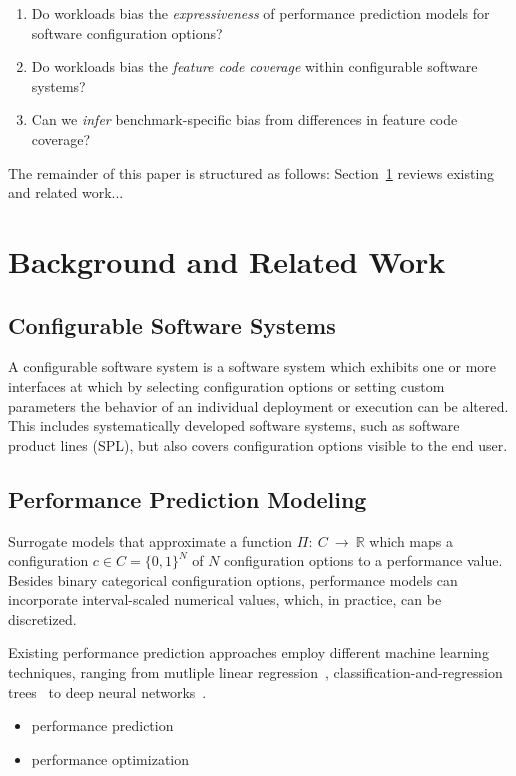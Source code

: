 \documentclass[conference]{IEEEtran}
\begin{document}
\begin{enumerate}
	\item Do workloads bias the \emph{expressiveness} of performance prediction models for software configuration options?
	\item Do workloads bias the \emph{feature code coverage} within configurable software systems?
	\item Can we \emph{infer} benchmark-specific bias from differences in feature code coverage?
\end{enumerate}

The remainder of this paper is structured as follows: Section~\ref{sec:related_work} reviews existing and related work...

\section{Background and Related Work}\label{sec:related_work}
\subsection{Configurable Software Systems}
A configurable software system is a software system which exhibits one or more interfaces at which by selecting configuration options or setting custom parameters the behavior of an individual deployment or execution can be altered. This includes systematically developed software systems, such as software product lines (SPL), but also covers configuration options visible to the end user.  
\subsection{Performance Prediction Modeling}
Surrogate models that approximate a function $\Pi:~C~\rightarrow~\mathbb{R}$ which maps a configuration $c \in C =\lbrace 0,1 \rbrace^N$ of $N$ configuration options to a performance value. Besides binary categorical configuration options, performance models can incorporate interval-scaled numerical values, which, in practice, can be discretized.

Existing performance prediction approaches employ different machine learning techniques, ranging from mutliple linear regression~\cite{siegmund_performance-influence_2015}, classification-and-regression trees~\cite{guoVariabilityawarePerformancePrediction2013,guo_2018_data,sarkarCostEfficientSamplingPerformance} to deep neural networks~\cite{haDeepPerf2019}.
\begin{itemize}
	\item performance prediction\cite{siegmund_performance-influence_2015,haDeepPerf2019,guo__2013,guo_2018_data,sarkarCostEfficientSamplingPerformance}
	\item performance optimization~\cite{nairUsingBadLearners2017,nairFlash18,ohFindingNearoptimalConfigurations2017}
\end{itemize}
\end{document}
